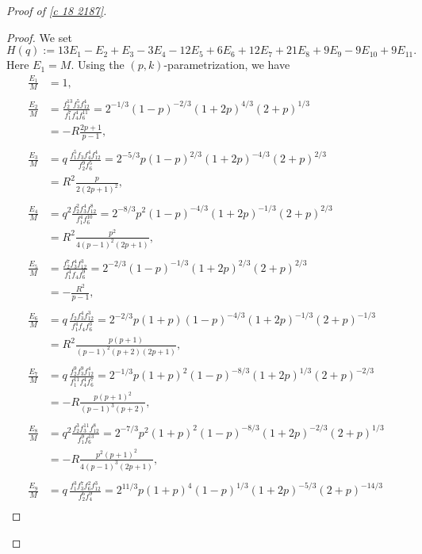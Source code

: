 \documentclass[12pt]{article}
\numberwithin{equation}{section}
\theoremstyle{plain}
\numberwithin{theorem}{section}
\theoremstyle{definition}
\theoremstyle{remark}
\begin{document}
\begin{proof}[Proof of \eqref{c 18 2187}]
\begin{proof}
We set
\begin{equation}\label{h(q)}
H(q):=13E_1-E_2+E_3-3E_4-12E_5+6E_6+12E_7+21E_8+9E_9-9E_{10}+9E_{11}.
\end{equation}
Here $E_1=M$. Using the $(p,k)$-parametrization, we have
\begin{align*}
\frac{E_1}{M}&=1,\\ \\
\frac{E_2}{M}
&= \frac{f_2^{13}f_3^5f_{12}^4}
     {f_1^7f_4^4f_6^{11}} =
2^{-1/3}
(1-p)^{-2/3}
(1+2p)^{4/3}
(2+p)^{1/3}
\\
&=
-R\frac{2p+1}{p-1},\\ \\
\frac{E_3}{M} &= q\,
\frac{f_1^5f_3f_4^4f_{12}^4}
     {f_2^9f_6^5}
=
2^{-5/3}p
(1-p)^{2/3}
(1+2p)^{-4/3}
(2+p)^{2/3}
\\
&=
R^2\frac{p}{2(2p+1)^2},\\ \\
\frac{E_4}{M} &= q^2
\frac{f_2^2f_3^4f_{12}^8}
     {f_1^4f_6^{10}}
=
2^{-8/3}p^2
(1-p)^{-4/3}
(1+2p)^{-1/3}
(2+p)^{2/3}
\\
&=
R^2
\frac{p^2}{4(p-1)^2(2p+1)},\\ \\
\frac{E_5}{M} &= \frac{f_2^7f_3^4f_{12}^3}
     {f_1^4f_4f_6^9}
=
2^{-2/3}
(1-p)^{-1/3}
(1+2p)^{2/3}
(2+p)^{2/3}
\\
&=
-\frac{R^2}{p-1},\\ \\
\frac{E_6}{M} &= q\,
\frac{f_2f_3^4f_{12}^3}
     {f_1^4f_4f_6^3}
=
2^{-2/3}p(1+p)
(1-p)^{-4/3}
(1+2p)^{-1/3}
(2+p)^{-1/3}
\\
&=
R^2
\frac{p(p+1)}
     {(p-1)^2(p+2)(2p+1)},\\ \\
\frac{E_7}{M} &= q\,
\frac{f_2^9f_3^9f_{12}^4}
     {f_1^{11}f_4^4f_6^7}
=
2^{-1/3}p(1+p)^2
(1-p)^{-8/3}
(1+2p)^{1/3}
(2+p)^{-2/3}
\\
&=
-R
\frac{p(p+1)^2}
     {(p-1)^3(p+2)},\\ \\
\frac{E_8}{M} &= q^2
\frac{f_2^3f_3^{11}f_{12}^8}
     {f_1^9f_6^{13}}
=
2^{-7/3}p^2(1+p)^2
(1-p)^{-8/3}
(1+2p)^{-2/3}
(2+p)^{1/3}
\\
&=
-R
\frac{p^2(p+1)^2}
     {4(p-1)^3(2p+1)},\\ \\
\frac{E_9}{M} &= q\,
\frac{f_1^3f_3^7f_6^2f_{12}^3}
     {f_2^6f_4^9}
=
2^{11/3}p(1+p)^4
(1-p)^{1/3}
(1+2p)^{-5/3}
(2+p)^{-14/3}
\\

\end{align*}
\end{proof}
\end{proof}
\end{document}
